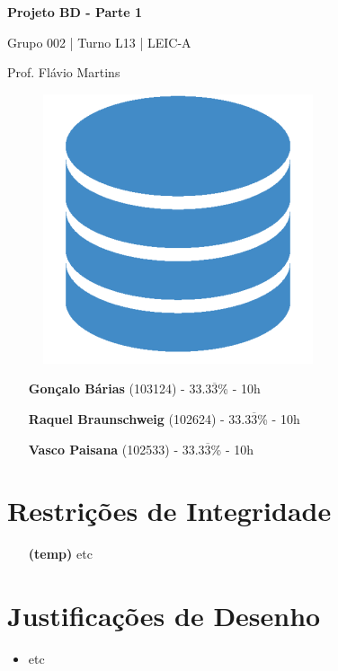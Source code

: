 \documentclass[12pt,a4paper]{article}
\begin{document}
  \begin{titlepage}
    \begin{center}
      \vspace*{5cm}

      \Huge
      \textbf{Projeto BD - Parte 1}

      \vspace{0.5cm}
      \LARGE
      Grupo 002 | Turno L13 | LEIC-A

      \vspace{0.5cm}
      \large
      Prof. Flávio Martins

      \vspace{0.5cm}
      \begin{figure}[h]
          \centering
          \includegraphics[scale=0.5]{report_logo.png}
      \end{figure}

      \vfill

      \large
      \begin{minipage}{0.8\textwidth}
        \begin{itemize}
          \item[] \textbf{Gonçalo Bárias} (103124) - 33.3$\overline{3}$\% - 10h
          \item[] \textbf{Raquel Braunschweig} (102624) - 33.3$\overline{3}$\% - 10h
          \item[] \textbf{Vasco Paisana} (102533) - 33.3$\overline{3}$\% - 10h
        \end{itemize}
      \end{minipage}
    \end{center}
  \end{titlepage}

  \begin{landscape}
    \centering
    
  \end{landscape}

  \section*{Restrições de Integridade}
  \footnotesize
  \begin{itemize}
    \item[\textbf{(temp)}] etc
  \end{itemize}

  \section*{Justificações de Desenho}
  \normalsize
  \begin{itemize}
    \item etc
  \end{itemize}
\end{document}

